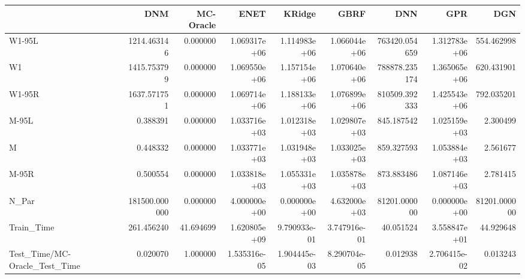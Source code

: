 \begin{tabular}{lrrrrrrrr}
\toprule
{} &            DNM &  MC-Oracle &          ENET &        KRidge &          GBRF &            DNN &           GPR &           DGN \\
\midrule
W1-95L                        &    1214.463146 &   0.000000 &  1.069317e+06 &  1.114983e+06 &  1.066044e+06 &  763420.054659 &  1.312783e+06 &    554.462998 \\
W1                            &    1415.753799 &   0.000000 &  1.069550e+06 &  1.157154e+06 &  1.070640e+06 &  788878.235174 &  1.365065e+06 &    620.431901 \\
W1-95R                        &    1637.571751 &   0.000000 &  1.069714e+06 &  1.188133e+06 &  1.076899e+06 &  810509.392333 &  1.425543e+06 &    792.035201 \\
M-95L                         &       0.388391 &   0.000000 &  1.033716e+03 &  1.012318e+03 &  1.029807e+03 &     845.187542 &  1.025159e+03 &      2.300499 \\
M                             &       0.448332 &   0.000000 &  1.033771e+03 &  1.031948e+03 &  1.033025e+03 &     859.327593 &  1.053884e+03 &      2.561677 \\
M-95R                         &       0.500554 &   0.000000 &  1.033818e+03 &  1.055331e+03 &  1.035878e+03 &     873.883486 &  1.087146e+03 &      2.781415 \\
N\_Par                         &  181500.000000 &   0.000000 &  4.000000e+00 &  0.000000e+00 &  4.632000e+03 &   81201.000000 &  0.000000e+00 &  81201.000000 \\
Train\_Time                    &     261.456240 &  41.694699 &  1.620805e+09 &  9.790933e-01 &  3.747916e-01 &      40.051524 &  3.558847e+01 &     44.929648 \\
Test\_Time/MC-Oracle\_Test\_Time &       0.020070 &   1.000000 &  1.535316e-05 &  1.904445e-03 &  8.290704e-05 &       0.012938 &  2.706415e-02 &      0.013243 \\
\bottomrule
\end{tabular}
